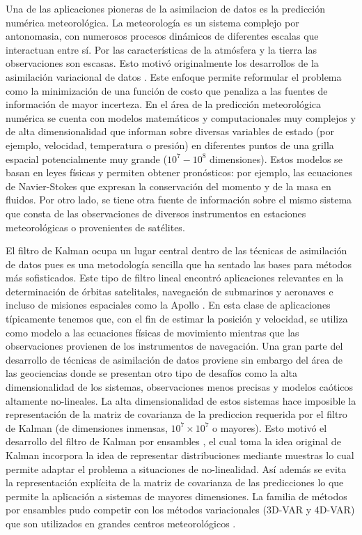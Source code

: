 Una de las aplicaciones pioneras de la asimilacion de datos es la predicción numérica meteorológica. La meteorología es un sistema complejo por antonomasia, con numerosos procesos dinámicos de diferentes escalas que interactuan entre sí. Por las características de la atmósfera y la tierra las observaciones son escasas. Esto motivó originalmente los desarrollos de la asimilación variacional de datos \citep{Talagrand1987}. Este enfoque permite reformular el problema como la minimización de una función de costo que penaliza a las fuentes de información de mayor incerteza. En el área de la predicción meteorológica numérica se cuenta con modelos matemáticos y computacionales muy complejos y de alta dimensionalidad que informan sobre diversas variables de estado (por ejemplo, velocidad, temperatura o presión) en diferentes puntos de una grilla espacial potencialmente muy grande ($10^7 - 10^8$ dimensiones). Estos modelos se basan en leyes físicas y permiten obtener pronósticos: por ejemplo, las ecuaciones de Navier-Stokes que expresan la conservación del momento y de la masa en fluidos. Por otro lado, se tiene otra fuente de información sobre el mismo sistema que consta de las observaciones de diversos instrumentos en estaciones meteorológicas o provenientes de satélites. 

El filtro de Kalman \citep{Kalman1960, Kalman1961} ocupa un lugar central dentro de las técnicas de asimilación de datos pues es una metodología sencilla que ha sentado las bases para métodos más sofisticados. Este tipo de filtro lineal encontró aplicaciones relevantes en la determinación de órbitas satelitales, navegación de submarinos y aeronaves e incluso de misiones espaciales como la Apollo \citep{Jazwinski1970}. En esta clase de aplicaciones típicamente tenemos que, con el fin de estimar la posición y velocidad, se utiliza como modelo a las ecuaciones físicas de movimiento mientras que las observaciones provienen de los instrumentos de navegación. Una gran parte del desarrollo de técnicas de asimilación de datos proviene sin embargo del área de las geociencias donde se presentan otro tipo de desafíos como la alta dimensionalidad de los sistemas, observaciones menos precisas y modelos caóticos altamente no-lineales. La alta dimensionalidad de estos sistemas hace imposible la representación de la matriz de covarianza de la prediccion requerida por el filtro de Kalman (de dimensiones inmensas, $10^7 \times 10^7$ o mayores). Esto motivó el desarrollo del filtro de Kalman por ensambles \citep{Evensen1994}, el cual toma la idea original de Kalman incorpora la idea de representar distribuciones mediante muestras lo cual permite adaptar el problema a situaciones de no-linealidad. Así además se evita la representación explícita de la matriz de covarianza de las predicciones lo que permite la aplicación a sistemas de mayores dimensiones. La familia de métodos por ensambles pudo competir con los métodos variacionales (3D-VAR y 4D-VAR) que son utilizados en grandes centros meteorológicos \citep{Kalnay2007}.

